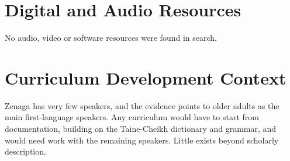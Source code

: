 \documentclass[12pt]{article}
\begin{document}
\section{Digital and Audio Resources}
No audio, video or software resources were found in search.

\section{Curriculum Development Context}
Zenaga has very few speakers, and the evidence points to older adults as the main first-language speakers. Any curriculum would have to start from documentation, building on the Taine-Cheikh dictionary and grammar, and would need work with the remaining speakers. Little exists beyond scholarly description.
\end{document}

